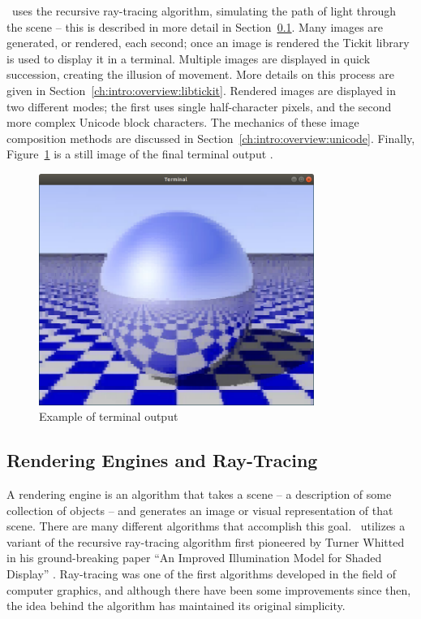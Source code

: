 \name\ uses the recursive ray-tracing algorithm, simulating the path of light through the scene -- this is described in more detail in Section~\ref{ch:intro:overview:raytracing}.
Many images are generated, or rendered, each second; once an image is rendered the Tickit library \cite{libtickitLibrary} is used to display it in a terminal.
Multiple images are displayed in quick succession, creating the illusion of movement.
More details on this process are given in Section~\ref{ch:intro:overview:libtickit}.
Rendered images are displayed in two different modes; the first uses single half-character pixels, and the second more complex Unicode block characters.
The mechanics of these image composition methods are discussed in Section~\ref{ch:intro:overview:unicode}.
Finally, Figure~\ref{fig:checker_metal} is a still image of the final terminal output .

\begin{figure}[htb]
  \centering
  \includegraphics[width=0.8\textwidth]{resources/checker_metal}
  \caption{Example of terminal output}
  \label{fig:checker_metal}
\end{figure}

\subsection{Rendering Engines and Ray-Tracing}
\label{ch:intro:overview:raytracing}

A rendering engine is an algorithm that takes a scene -- a description of some collection of objects -- and generates an image or visual representation of that scene.
There are many different algorithms that accomplish this goal.
\name\ utilizes a variant of the recursive ray-tracing algorithm first pioneered by Turner Whitted in his ground-breaking paper ``An Improved Illumination Model for Shaded Display'' \cite{whitted1980improved}.
Ray-tracing was one of the first algorithms developed in the field of computer graphics, and although there have been some improvements since then, the idea behind the algorithm has maintained its original simplicity.


